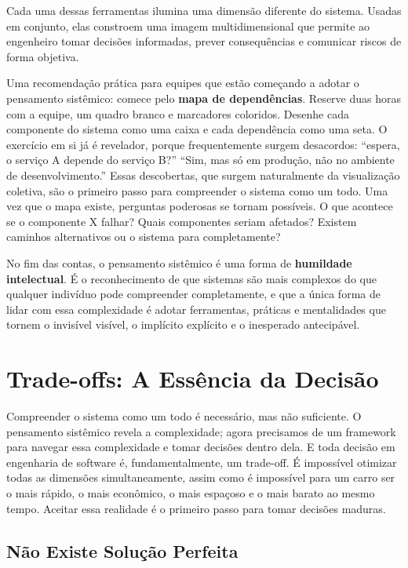 Cada uma dessas ferramentas ilumina uma dimensão diferente do sistema.
Usadas em conjunto, elas constroem uma imagem multidimensional que
permite ao engenheiro tomar decisões informadas, prever consequências
e comunicar riscos de forma objetiva.

Uma recomendação prática para equipes que estão começando a adotar o
pensamento sistêmico: comece pelo \textbf{mapa de dependências}. Reserve
duas horas com a equipe, um quadro branco e marcadores coloridos. Desenhe
cada componente do sistema como uma caixa e cada dependência como uma
seta. O exercício em si já é revelador, porque frequentemente surgem
desacordos: ``espera, o serviço A depende do serviço B?'' ``Sim, mas
só em produção, não no ambiente de desenvolvimento.'' Essas descobertas,
que surgem naturalmente da visualização coletiva, são o primeiro passo
para compreender o sistema como um todo. Uma vez que o mapa existe,
perguntas poderosas se tornam possíveis. O que acontece se o componente
X falhar? Quais componentes seriam afetados? Existem caminhos
alternativos ou o sistema para completamente?

No fim das contas, o pensamento sistêmico é uma forma de
\textbf{humildade intelectual}. É o reconhecimento de que sistemas são
mais complexos do que qualquer indivíduo pode compreender completamente,
e que a única forma de lidar com essa complexidade é adotar ferramentas,
práticas e mentalidades que tornem o invisível visível, o implícito
explícito e o inesperado antecipável.

\section{Trade-offs: A Essência da Decisão}

Compreender o sistema como um todo é necessário, mas não suficiente. O
pensamento sistêmico revela a complexidade; agora precisamos de um
framework para navegar essa complexidade e tomar decisões dentro dela.
E toda decisão em engenharia de software é, fundamentalmente, um
trade-off. É impossível otimizar todas as dimensões simultaneamente,
assim como é impossível para um carro ser o mais rápido, o mais
econômico, o mais espaçoso e o mais barato ao mesmo tempo. Aceitar
essa realidade é o primeiro passo para tomar decisões maduras.

\subsection{Não Existe Solução Perfeita}

